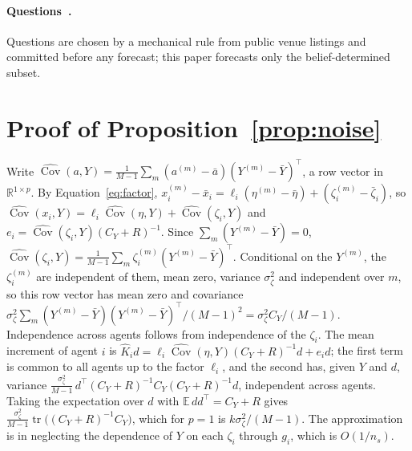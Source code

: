 \documentclass[10pt]{article}
\theoremstyle{remark}
\newcommand{\R}{\mathbb{R}}
\newcommand{\E}{\mathbb{E}}
\newcommand{\Cov}{\operatorname{Cov}}
\newcommand{\tr}{\operatorname{tr}}
\begin{document}
\paragraph{Questions~\cite{rw_bench}.} Questions are chosen by a mechanical rule from public venue listings and committed before any forecast; this paper forecasts only the belief-determined subset.

\section{Proof of Proposition~\ref{prop:noise}}
\label{app:proof}
Write $\widehat{\Cov}(a,Y)=\frac{1}{M-1}\sum_m(a^{(m)}-\bar a)(Y^{(m)}-\bar Y)^\top$, a row vector in $\R^{1\times p}$. By Equation~\eqref{eq:factor}, $x_i^{(m)}-\bar x_i=\ell_i(\eta^{(m)}-\bar\eta)+(\zeta_i^{(m)}-\bar\zeta_i)$, so $\widehat{\Cov}(x_i,Y)=\ell_i\widehat{\Cov}(\eta,Y)+\widehat{\Cov}(\zeta_i,Y)$ and $e_i=\widehat{\Cov}(\zeta_i,Y)(C_Y+R)^{-1}$. Since $\sum_m(Y^{(m)}-\bar Y)=0$, $\widehat{\Cov}(\zeta_i,Y)=\frac{1}{M-1}\sum_m\zeta_i^{(m)}(Y^{(m)}-\bar Y)^\top$. Conditional on the $Y^{(m)}$, the $\zeta_i^{(m)}$ are independent of them, mean zero, variance $\sigma_\zeta^2$ and independent over $m$, so this row vector has mean zero and covariance $\sigma_\zeta^2\sum_m(Y^{(m)}-\bar Y)(Y^{(m)}-\bar Y)^\top/(M-1)^2=\sigma_\zeta^2C_Y/(M-1)$. Independence across agents follows from independence of the $\zeta_i$. The mean increment of agent $i$ is $\hat K_id=\ell_i\widehat{\Cov}(\eta,Y)(C_Y+R)^{-1}d+e_id$; the first term is common to all agents up to the factor $\ell_i$, and the second has, given $Y$ and $d$, variance $\frac{\sigma_\zeta^2}{M-1}\,d^\top(C_Y+R)^{-1}C_Y(C_Y+R)^{-1}d$, independent across agents. Taking the expectation over $d$ with $\E\,dd^\top=C_Y+R$ gives $\frac{\sigma_\zeta^2}{M-1}\tr\big((C_Y+R)^{-1}C_Y\big)$, which for $p=1$ is $k\sigma_\zeta^2/(M-1)$. The approximation is in neglecting the dependence of $Y$ on each $\zeta_i$ through $g_i$, which is $O(1/n_s)$.
\end{document}
